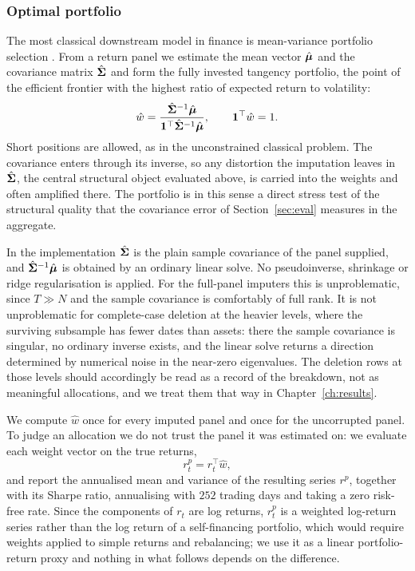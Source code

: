 \subsubsection{Optimal portfolio}
\label{sec:portfolio}

The most classical downstream model in finance is mean-variance portfolio
selection \citep{markowitz1952}. From a return panel we estimate the mean
vector $\hat{\boldsymbol{\mu}}$ and the covariance matrix $\hat{\boldsymbol{\Sigma}}$ and form the
fully invested tangency portfolio, the point of the efficient frontier with
the highest ratio of expected return to volatility:
\[
\hat{w} = \frac{\hat{\boldsymbol{\Sigma}}^{-1}\hat{\boldsymbol{\mu}}}
               {\mathbf{1}^\top \hat{\boldsymbol{\Sigma}}^{-1}\hat{\boldsymbol{\mu}}},
\qquad
\mathbf{1}^\top \hat{w} = 1 .
\]
Short positions are allowed, as in the unconstrained classical problem. The
covariance enters through its inverse, so any distortion the imputation leaves
in $\hat{\boldsymbol{\Sigma}}$, the central structural object evaluated above, is carried
into the weights and often amplified there. The portfolio is in this sense a
direct stress test of the structural quality that the covariance error of
Section~\ref{sec:eval} measures in the aggregate.

In the implementation $\hat{\boldsymbol{\Sigma}}$ is the plain sample covariance of the panel
supplied, and $\hat{\boldsymbol{\Sigma}}^{-1}\hat{\boldsymbol{\mu}}$ is obtained by an ordinary linear
solve. No pseudoinverse, shrinkage or ridge regularisation is applied. For the
full-panel imputers this is unproblematic, since $T \gg N$ and the sample
covariance is comfortably of full rank. It is not unproblematic for complete-case
deletion at the heavier levels, where the surviving subsample has fewer dates
than assets: there the sample covariance is singular, no ordinary inverse exists,
and the linear solve returns a direction determined by numerical noise in the
near-zero eigenvalues. The deletion rows at those levels should accordingly be
read as a record of the breakdown, not as meaningful allocations, and we treat
them that way in Chapter~\ref{ch:results}.

We compute $\hat{w}$ once for every imputed panel and once for the uncorrupted
panel. To judge an allocation we do not trust the panel it was estimated on: we
evaluate each weight vector on the true returns,
\[
r^{p}_t = r_t^\top \hat{w} ,
\]
and report the annualised mean and variance of the resulting series $r^{p}$,
together with its Sharpe ratio, annualising with $252$ trading days and taking a
zero risk-free rate. Since the components of $r_t$ are log returns, $r^p_t$ is a
weighted log-return series rather than the log return of a self-financing
portfolio, which would require weights applied to simple returns and rebalancing;
we use it as a linear portfolio-return proxy and nothing in what follows depends
on the difference.

